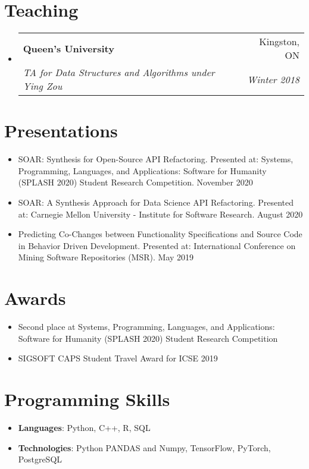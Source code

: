 \documentclass[letterpaper,11pt]{article}
\makeatletter
\newcommand{\resumeSubheading}[4]{
  \vspace{-1pt}\item
    \begin{tabular*}{0.97\textwidth}{l@{\extracolsep{\fill}}r}
      \textbf{#1} & #2 \\
      \textit{\small#3} & \textit{\small #4} \\
    \end{tabular*}\vspace{-5pt}
}
\newcommand{\resumeSubHeadingListStart}{\begin{itemize}[leftmargin=*]}
\newcommand{\resumeSubHeadingListEnd}{\end{itemize}}
\makeatother
\begin{document}
\section{Teaching}
\resumeSubHeadingListStart

\resumeSubheading
{Queen's University}{Kingston, ON}
{TA for Data Structures and Algorithms under Ying Zou}{Winter 2018}
\resumeSubHeadingListEnd

\section{Presentations}
\resumeSubHeadingListStart
\item{SOAR: Synthesis for Open-Source API Refactoring. Presented at: Systems, Programming, Languages, and Applications: Software for Humanity (SPLASH 2020) Student Research Competition. November 2020}

\item{SOAR: A Synthesis Approach for Data Science API Refactoring. Presented at: Carnegie Mellon University - Institute for Software Research. August 2020}

\item{Predicting Co-Changes between Functionality Specifications and Source Code in Behavior Driven Development. Presented at: International Conference on Mining Software Repositories (MSR). May 2019	
}
\resumeSubHeadingListEnd

\section{Awards}
\resumeSubHeadingListStart
\item{Second place at Systems, Programming, Languages, and Applications: Software for Humanity (SPLASH 2020) Student Research Competition}

\item{SIGSOFT CAPS Student Travel Award for ICSE 2019}

\resumeSubHeadingListEnd


\section{Programming Skills}
 \resumeSubHeadingListStart
   \item{
        \textbf{Languages}{: Python, C++, R, SQL}
    }
    \item{
        \textbf{Technologies}{: Python PANDAS and Numpy, TensorFlow, PyTorch, PostgreSQL}
    }
 \resumeSubHeadingListEnd
\end{document}
